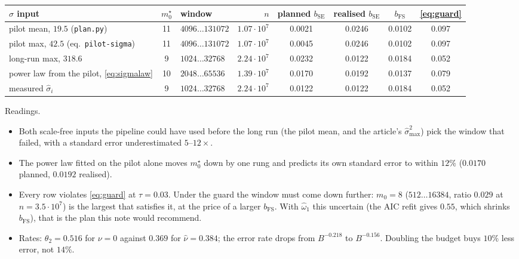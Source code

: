\documentclass[11pt]{article}
\newcommand{\bSE}{b_{\mathrm{SE}}}
\newcommand{\bFS}{b_{\mathrm{FS}}}
\begin{document}
\begin{center}
\small\setlength{\tabcolsep}{4pt}
\begin{tabular}{@{}lclrcccc@{}}
\toprule
$\sigma$ input & $m_0^\star$ & window & $n$ & planned $\bSE$ & realised $\bSE$ & $\bFS$ & \eqref{eq:guard}\\
\midrule
pilot mean, $19.5$ (\texttt{plan.py}) & 11 & $4096\ldots131072$ & $1.07\cdot10^7$ & 0.0021 & 0.0246 & 0.0102 & 0.097\\
pilot max, $42.5$ (eq.~\texttt{pilot-sigma}) & 11 & $4096\ldots131072$ & $1.07\cdot10^7$ & 0.0045 & 0.0246 & 0.0102 & 0.097\\
long-run max, $318.6$ & 9 & $1024\ldots32768$ & $2.24\cdot10^7$ & 0.0232 & 0.0122 & 0.0184 & 0.052\\
power law from the pilot, \eqref{eq:sigmalaw} & 10 & $2048\ldots65536$ & $1.39\cdot10^7$ & 0.0170 & 0.0192 & 0.0137 & 0.079\\
measured $\hat\sigma_i$ & 9 & $1024\ldots32768$ & $2.24\cdot10^7$ & 0.0122 & 0.0122 & 0.0184 & 0.052\\
\bottomrule
\end{tabular}
\end{center}

\noindent Readings.
\begin{itemize}
  \item Both scale-free inputs the pipeline could have used before the long run
  (the pilot mean, and the article's $\hat\sigma^2_{\max}$) pick the window that
  failed, with a standard error underestimated $5$--$12\times$.
  \item The power law fitted on the pilot alone moves $m_0^\star$ down by one
  rung and predicts its own standard error to within $12\%$ ($0.0170$ planned,
  $0.0192$ realised).
  \item Every row violates \eqref{eq:guard} at $\tau=0.03$. Under the guard the
  window must come down further: $m_0=8$ ($512\ldots16384$, ratio $0.029$ at
  $n=3.5\cdot10^7$) is the largest that satisfies it, at the price of a larger
  $\bFS$. With $\hat\omega_1$ this uncertain (the AIC refit gives $0.55$, which
  shrinks $\bFS$), that is the plan this note would recommend.
  \item Rates: $\theta_2=0.516$ for $\nu=0$ against $0.369$ for $\hat\nu=0.384$;
  the error rate drops from $B^{-0.218}$ to $B^{-0.156}$. Doubling the budget
  buys $10\%$ less error, not $14\%$.
\end{itemize}

\end{document}
